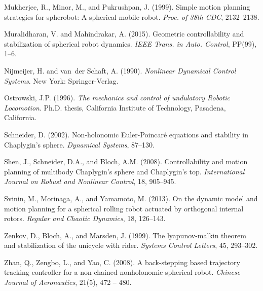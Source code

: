 \documentclass{ifacconf}
\begin{document}
\begin{thebibliography}{26}
Mukherjee, R., Minor, M., and Pukrushpan, J. (1999).
\newblock Simple motion planning strategies for spherobot: A spherical mobile
  robot.
\newblock \emph{Proc. of 38th CDC}, 2132--2138.

Muralidharan, V. and Mahindrakar, A. (2015).
\newblock Geometric controllability and stabilization of spherical robot
  dynamics.
\newblock \emph{{IEEE} {T}rans. in {A}uto. {C}ontrol}, PP(99), 1--6.

Nijmeijer, H. and van~der Schaft, A. (1990).
\newblock \emph{Nonlinear Dynamical Control Systems}.
\newblock New York: Springer-Verlag.

Ostrowski, J.P. (1996).
\newblock \emph{The mechanics and control of undulatory Robotic Locomotion}.
\newblock Ph.D. thesis, California Institute of Technology, Pasadena,
  California.

Schneider, D. (2002).
\newblock Non-holonomic {E}uler-{P}oincar\'{e} equations and stability in
  {C}haplygin's sphere.
\newblock \emph{Dynamical Systems}, 87--130.

Shen, J., Schneider, D.A., and Bloch, A.M. (2008).
\newblock Controllability and motion planning of multibody {C}haplygin's sphere
  and {C}haplygin's top.
\newblock \emph{International Journal on Robust and Nonlinear Control}, 18,
  905--945.

Svinin, M., Morinaga, A., and Yamamoto, M. (2013).
\newblock On the dynamic model and motion planning for a spherical rolling
  robot actuated by orthogonal internal rotors.
\newblock \emph{Regular and Chaotic Dynamics}, 18, 126--143.

Zenkov, D., Bloch, A., and Marsden, J. (1999).
\newblock The lyapunov-malkin theorem and stabilization of the unicycle with
  rider.
\newblock \emph{Systems Control Letters}, 45, 293--302.

Zhan, Q., Zengbo, L., and Yao, C. (2008).
\newblock A back-stepping based trajectory tracking controller for a
  non-chained nonholonomic spherical robot.
\newblock \emph{Chinese Journal of Aeronautics}, 21(5), 472 -- 480.

\end{thebibliography}
\end{document}
